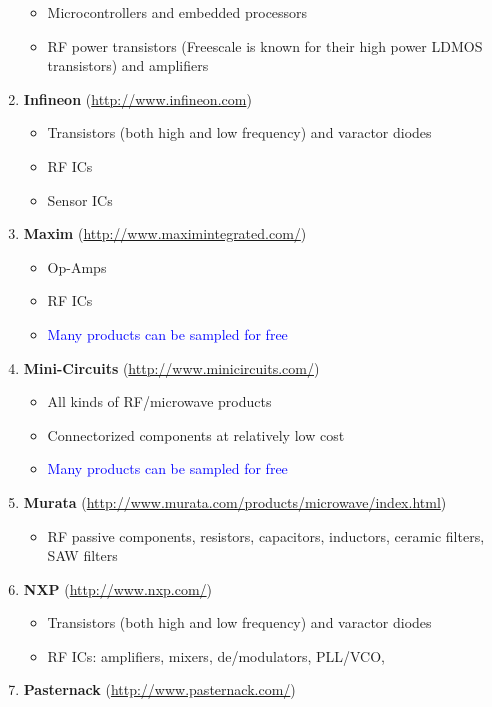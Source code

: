 \documentclass[letterpaper, 11pt]{article}
\begin{document}
\begin{enumerate}
\begin{itemize}
			\item Microcontrollers and embedded processors
			\item RF power transistors (Freescale is known for their high power LDMOS transistors) and amplifiers
		\end{itemize}		
	\item \textbf{Infineon} (\url{http://www.infineon.com})
		\begin{itemize}
			\item Transistors (both high and low frequency) and varactor diodes
			\item RF ICs
			\item Sensor ICs
		\end{itemize}
	\item \textbf{Maxim} (\url{http://www.maximintegrated.com/})
		\begin{itemize}
			\item Op-Amps
			\item RF ICs
			\item \textcolor{blue}{Many products can be sampled for free}
		\end{itemize}
	\item \textbf{Mini-Circuits} (\url{http://www.minicircuits.com/})
		\begin{itemize}
			\item All kinds of RF/microwave products
			\item Connectorized components at relatively low cost
			\item \textcolor{blue}{Many products can be sampled for free}
		\end{itemize}
	\item \textbf{Murata} (\url{http://www.murata.com/products/microwave/index.html})
		\begin{itemize}
			\item RF passive components, resistors, capacitors, inductors, ceramic filters, SAW filters
		\end{itemize}
	\item \textbf{NXP} (\url{http://www.nxp.com/})
		\begin{itemize}
			\item Transistors (both high and low frequency) and varactor diodes
			\item RF ICs: amplifiers, mixers, de/modulators, PLL/VCO, 
		\end{itemize}
	\item \textbf{Pasternack} (\url{http://www.pasternack.com/})
		\begin{itemize}

\end{itemize}
\end{enumerate}
\end{document}
